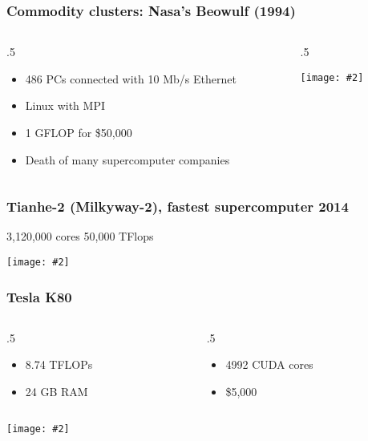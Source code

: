 \documentclass{beamer}
\newcommand{\bi}{\begin{itemize}}
\newcommand{\ii}{\item}
\newcommand{\ei}{\end{itemize}}
\newcommand{\grf}[2]{\centerline{\texttt{[image: \#2]}}}
\newcommand{\bfr}[1]{\begin{frame}[fragile]\frametitle{{ #1 }}}
\newcommand{\cola}[1]{\begin{columns}\begin{column}{#1\textwidth}}
\newcommand{\colb}[1]{\end{column}\begin{column}{#1\textwidth}}
\newcommand{\colc}{\end{column}\end{columns}}
\begin{document}
\bfr{Commodity clusters:  Nasa's Beowulf (1994)}
\cola{.5}
\bi
\ii 486 PCs connected with 10 Mb/s Ethernet
\ii Linux with MPI
\ii 1 GFLOP for \$50,000
\ii Death of many supercomputer companies
\ei
\colb{.5}
\grf{1}{beowulf.jpg}
\colc
\end{frame}

\bfr{Tianhe-2 (Milkyway-2), fastest supercomputer 2014}


 3,120,000 cores \hfill 50,000 TFlops


\grf{1}{Tianhe-2.jpg}

\end{frame}

\bfr{Tesla K80}
\cola{.5}
\bi
\ii 8.74 TFLOPs
\ii 24 GB RAM
\ei
\colb{.5}
\bi
\ii 4992 CUDA cores
\ii \$5,000
\ei
\colc

\grf{.8}{tesla.jpg}

\end{frame}
\end{document}
